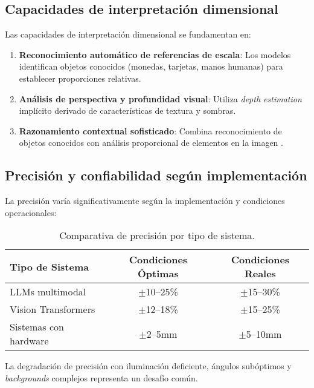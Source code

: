 \subsection{Capacidades de interpretación dimensional}

Las capacidades de interpretación dimensional se fundamentan en:

\begin{enumerate}
    \item \textbf{Reconocimiento automático de referencias de escala}: Los modelos identifican objetos conocidos (monedas, tarjetas, manos humanas) para establecer proporciones relativas.
    \item \textbf{Análisis de perspectiva y profundidad visual}: Utiliza \textit{depth estimation} implícito derivado de características de textura y sombras.
    \item \textbf{Razonamiento contextual sofisticado}: Combina reconocimiento de objetos conocidos con análisis proporcional de elementos en la imagen \cite{Oquab2024}.
\end{enumerate}

\subsection{Precisión y confiabilidad según implementación}

La precisión varía significativamente según la implementación y condiciones operacionales:

\begin{table}[H]
\centering
\caption{Comparativa de precisión por tipo de sistema.}
\label{tab:precision_sistemas}
\begin{tabular}{@{}lcc@{}}
\toprule
\textbf{Tipo de Sistema} & \textbf{Condiciones Óptimas} & \textbf{Condiciones Reales} \\
\midrule
LLMs multimodal & $\pm$10--25\% & $\pm$15--30\% \\
Vision Transformers & $\pm$12--18\% & $\pm$15--25\% \\
Sistemas con hardware & $\pm$2--5mm & $\pm$5--10mm \\
\bottomrule
\end{tabular}
\end{table}

La degradación de precisión con iluminación deficiente, ángulos subóptimos y \textit{backgrounds} complejos representa un desafío común.


